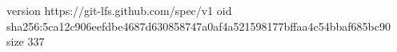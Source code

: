 version https://git-lfs.github.com/spec/v1
oid sha256:5ca12c906eefdbe4687d630858747a0af4a521598177bffaa4c54bbaf685bc90
size 337
